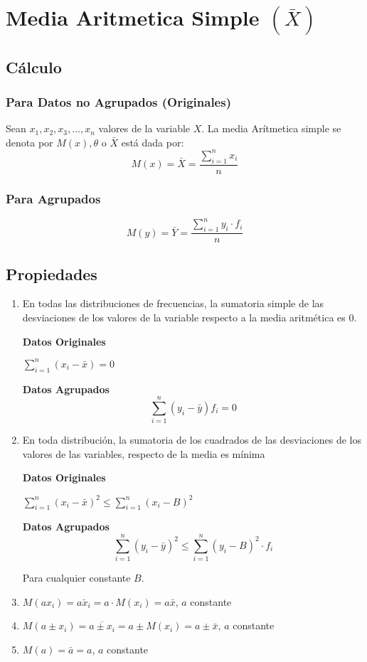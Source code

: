 \section{Media Aritmetica Simple $(\bar{X})$} 
\subsection{Cálculo}
\subsubsection{Para Datos no Agrupados (Originales)}
Sean $x_1,x_2,x_3,\ldots ,x_n$ valores de la variable $X$. La media Arítmetica simple se denota por $M(x),\theta$ o $\bar{X}$ está dada por:
$$M(x)=\bar{X}=\dfrac{\displaystyle\sum_{i=1}^{n}x_i}{n}$$
\subsubsection{Para Agrupados}
$$M(y)=\bar{Y}=\dfrac{\displaystyle\sum_{i=1}^{n}y_i\cdot f_i}{n}$$
\subsection{Propiedades}
\begin{enumerate}
\item En todas las distribuciones de frecuencias, la sumatoria simple de las desviaciones de los valores de la variable respecto a la media aritmética es 0.
\begin{multicols}{2}
\textbf{Datos Originales} 
\begin{center}
$\displaystyle\sum_{i=1}^{n}(x_i-\bar{x})=0$
\end{center}
\columnbreak
\textbf{Datos Agrupados}
$$\displaystyle\sum_{i=1}^{n}(y_i-\bar{y})f_i=0$$
\end{multicols}
\item En toda distribución, la sumatoria de los cuadrados de las desviaciones de los valores de las variables, respecto de la media es mínima
\begin{multicols}{2}
\textbf{Datos Originales}
\begin{center}
$\displaystyle\sum_{i=1}^{n}(x_i-\bar{x})^2 \leq \displaystyle\sum_{i=1}^{n}(x_i-B)^2 $
\end{center}
\columnbreak
\textbf{Datos Agrupados}
$$\displaystyle\sum_{i=1}^{n}(y_i-\bar{y})^2 \leq \displaystyle\sum_{i=1}^{n}(y_i-B)^2\cdot f_i $$ 
\end{multicols}
Para cualquier constante $B$.
\item $M(a x_i)=\bar{ax_i} = a\cdot M(x_i) = a\bar{x}$, $a$ constante
\item $M(a \pm x_i)=\overline{{a \pm x_i}} = a\pm M(x_i) = a\pm\bar{x}$, $a$ constante
\item $M(a)=\bar{a}=a$, $a$ constante
\end{enumerate}
